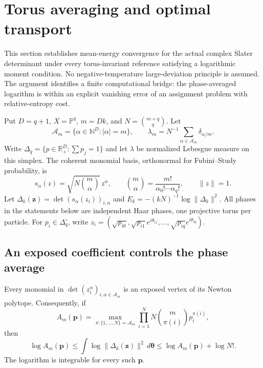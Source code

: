\section{Torus averaging and optimal transport}
\label{tor:section}

This section establishes mean-energy convergence for the actual complex
Slater determinant under every torus-invariant reference satisfying a
logarithmic moment condition. No negative-temperature large-deviation
principle is assumed. The argument identifies a finite computational
bridge: the phase-averaged logarithm is within an explicit vanishing
error of an assignment problem with relative-entropy cost.

Put $D=q+1$, $X=\mathbb P^q$, $m=Dk$, and
$N=\binom{m+q}{q}$. Let
\[
 \mathcal A_m=\{\alpha\in\mathbb N^D:|\alpha|=m\},\qquad
 \lambda_m=N^{-1}\sum_{\alpha\in\mathcal A_m}\delta_{\alpha/m}.
\]
Write $\Delta_q=\{p\in\mathbb R_+^D:\sum p_j=1\}$ and let
$\lambda$ be normalized Lebesgue measure on this simplex. The coherent
monomial basis, orthonormal for Fubini--Study probability, is
\[
 s_\alpha(z)=\sqrt{N\binom m\alpha}\,z^\alpha,
 \qquad \binom m\alpha=\frac{m!}{\alpha_0!\cdots\alpha_q!},
 \qquad \|z\|=1.
\]
Let $\Delta_k(\boldsymbol z)=\det(s_\alpha(z_i))_{i,\alpha}$ and
$E_k=-(kN)^{-1}\log\|\Delta_k\|^2$. All phases in the statements
below are independent Haar phases, one projective torus per particle.
For $p_i\in\Delta_q^\circ$, write
$z_i=(\sqrt{p_{i0}},\sqrt{p_{i1}}e^{i\theta_{i1}},\ldots,
\sqrt{p_{iq}}e^{i\theta_{iq}})$.

\subsection{An exposed coefficient controls the phase average}

\begin{lemma}
\label{tor:vertices}
Every monomial in $\det(z_i^\alpha)_{i,\alpha\in\mathcal A_m}$
is an exposed vertex of its Newton polytope. Consequently, if
\[
 A_m(\boldsymbol p)=
 \max_{\pi:\{1,\ldots,N\}\simeq\mathcal A_m}
 \prod_{i=1}^N N\binom m{\pi(i)}p_i^{\pi(i)},
\]
then
\begin{equation}
 \log A_m(\boldsymbol p)
 \le \int\log\|\Delta_k(\boldsymbol z)\|^2\,d\boldsymbol\theta
 \le \log A_m(\boldsymbol p)+\log N!.
 \label{tor:phase-squeeze}
\end{equation}
The logarithm is integrable for every such $\boldsymbol p$.
\end{lemma}


